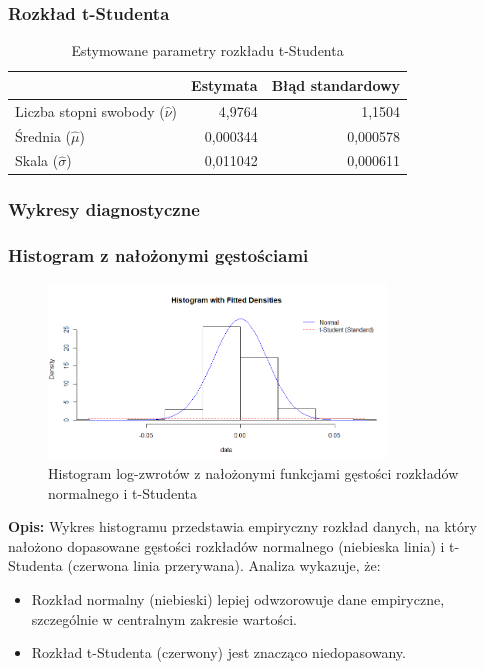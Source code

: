 \documentclass[a4paper,11pt]{article}
\begin{document}
\subsubsection{Rozkład t-Studenta}

\begin{table}[H]
    \centering
    \begin{tabular}{|l|r|r|}
        \hline
        & \textbf{Estymata} & \textbf{Błąd standardowy} \\
        \hline
        Liczba stopni swobody ($\hat{\nu}$) & 4,9764 & 1,1504 \\
        Średnia ($\hat{\mu}$) & 0,000344 & 0,000578 \\
        Skala ($\hat{\sigma}$) & 0,011042 & 0,000611 \\
        \hline
    \end{tabular}
    \caption{Estymowane parametry rozkładu t-Studenta}
    \label{tab:fit_t}
\end{table}

\subsubsection{Wykresy diagnostyczne}

\subsubsection{Histogram z nałożonymi gęstościami}

\begin{figure}[H]
    \centering
    \includegraphics[width=0.8\textwidth]{./Wojtek/histogram-z-gestosciami.png}
    \caption{Histogram log-zwrotów z nałożonymi funkcjami gęstości rozkładów normalnego i t-Studenta}
    \label{fig:histogram_gestosci}
\end{figure}

\textbf{Opis:} Wykres histogramu przedstawia empiryczny rozkład danych, na który nałożono dopasowane gęstości rozkładów normalnego (niebieska linia) i t-Studenta (czerwona linia przerywana).  
Analiza wykazuje, że:
\begin{itemize}
    \item Rozkład normalny (niebieski) lepiej odwzorowuje dane empiryczne, szczególnie w centralnym zakresie wartości.
    \item Rozkład t-Studenta (czerwony) jest znacząco niedopasowany.
\end{itemize}
\end{document}
